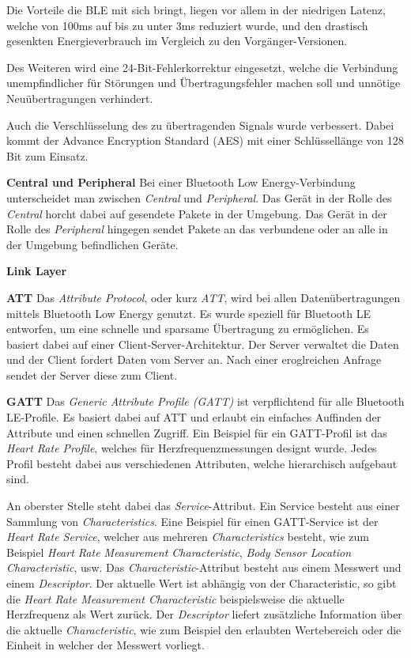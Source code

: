 Die Vorteile die BLE mit sich bringt, liegen vor allem in der niedrigen Latenz, welche von 100ms auf bis zu unter 3ms reduziert wurde, und den drastisch gesenkten Energieverbrauch im Vergleich zu den Vorgänger-Versionen.

Des Weiteren wird eine 24-Bit-Fehlerkorrektur eingesetzt, welche die Verbindung unempfindlicher für Störungen und Übertragungsfehler machen soll und unnötige Neuübertragungen verhindert.

Auch die Verschlüsselung des zu übertragenden Signals wurde verbessert. Dabei kommt der Advance Encryption Standard (AES) mit einer Schlüssellänge von 128 Bit zum Einsatz.

\textbf{Central und Peripheral}
Bei einer Bluetooth Low Energy-Verbindung unterscheidet man zwischen \emph{Central} und \emph{Peripheral}. Das Gerät in der Rolle des \emph{Central} horcht dabei auf gesendete Pakete in der Umgebung. Das Gerät in der Rolle des \emph{Peripheral} hingegen sendet Pakete an das verbundene oder an alle in der Umgebung befindlichen Geräte. 

\textbf{Link Layer}

\textbf{ATT}
Das \emph{Attribute Protocol}, oder kurz \emph{ATT}, wird bei allen Datenübertragungen mittels Bluetooth Low Energy genutzt. Es wurde speziell für Bluetooth LE entworfen, um eine schnelle und sparsame Übertragung zu ermöglichen. Es basiert dabei auf einer Client-Server-Architektur. 
Der Server verwaltet die Daten und der Client fordert Daten vom Server an. Nach einer eroglreichen Anfrage sendet der Server diese zum Client.

\textbf{GATT}
Das \emph{Generic Attribute Profile (GATT)} ist verpflichtend für alle Bluetooth LE-Profile. Es basiert dabei auf ATT und erlaubt ein einfaches Auffinden der Attribute und einen schnellen Zugriff. Ein Beispiel für ein GATT-Profil ist das \emph{Heart Rate Profile}, welches für Herzfrequenzmessungen designt wurde.
Jedes Profil besteht dabei aus verschiedenen Attributen, welche hierarchisch aufgebaut sind.

An oberster Stelle steht dabei das \emph{Service}-Attribut. Ein Service besteht aus einer Sammlung von \emph{Characteristics}. Eine Beispiel für einen GATT-Service ist der \emph{Heart Rate Service}, welcher aus mehreren \emph{Characteristics} besteht, wie zum Beispiel \emph{Heart Rate Measurement Characteristic}, \emph{Body Sensor Location Characteristic}, usw. 
Das \emph{Characteristic}-Attribut besteht aus einem Messwert und einem \emph{Descriptor}. Der aktuelle Wert ist abhängig von der Characteristic, so gibt die \emph{Heart Rate Measurement Characteristic} beispielsweise die aktuelle Herzfrequenz als Wert zurück. 
Der \emph{Descriptor} liefert zusätzliche Information über die aktuelle \emph{Characteristic}, wie zum Beispiel den erlaubten Wertebereich oder die Einheit in welcher der Messwert vorliegt.


